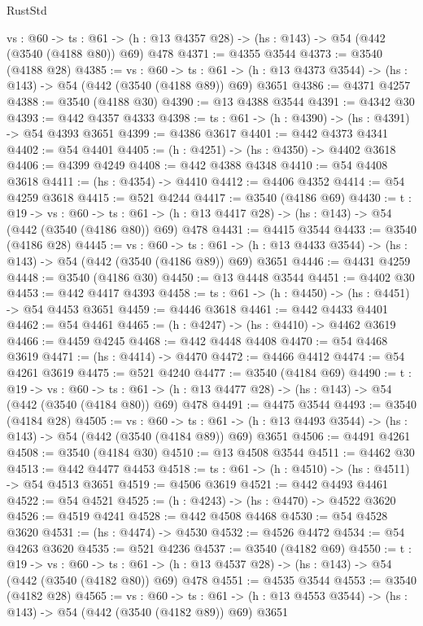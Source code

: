 \begin{lexlean}{RustStd}
\begin{coremodule}
  {vs : @60} ->
  {ts : @61} -> (h : @13 @4357 @28) -> (hs : @143) -> @54 (@442 (@3540 (@4188 @80)) @69) @478
@4371 := @4355 @3544
@4373 := @3540 (@4188 @28)
@4385 := {vs : @60} ->
  {ts : @61} -> (h : @13 @4373 @3544) -> (hs : @143) -> @54 (@442 (@3540 (@4188 @89)) @69) @3651
@4386 := @4371 @4257
@4388 := @3540 (@4188 @30)
@4390 := @13 @4388 @3544
@4391 := @4342 @30
@4393 := @442 @4357 @4333
@4398 := {ts : @61} -> (h : @4390) -> (hs : @4391) -> @54 @4393 @3651
@4399 := @4386 @3617
@4401 := @442 @4373 @4341
@4402 := @54 @4401
@4405 := (h : @4251) -> (hs : @4350) -> @4402 @3618
@4406 := @4399 @4249
@4408 := @442 @4388 @4348
@4410 := @54 @4408 @3618
@4411 := (hs : @4354) -> @4410
@4412 := @4406 @4352
@4414 := @54 @4259 @3618
@4415 := @521 @4244
@4417 := @3540 (@4186 @69)
@4430 := {t : @19} ->
  {vs : @60} ->
  {ts : @61} -> (h : @13 @4417 @28) -> (hs : @143) -> @54 (@442 (@3540 (@4186 @80)) @69) @478
@4431 := @4415 @3544
@4433 := @3540 (@4186 @28)
@4445 := {vs : @60} ->
  {ts : @61} -> (h : @13 @4433 @3544) -> (hs : @143) -> @54 (@442 (@3540 (@4186 @89)) @69) @3651
@4446 := @4431 @4259
@4448 := @3540 (@4186 @30)
@4450 := @13 @4448 @3544
@4451 := @4402 @30
@4453 := @442 @4417 @4393
@4458 := {ts : @61} -> (h : @4450) -> (hs : @4451) -> @54 @4453 @3651
@4459 := @4446 @3618
@4461 := @442 @4433 @4401
@4462 := @54 @4461
@4465 := (h : @4247) -> (hs : @4410) -> @4462 @3619
@4466 := @4459 @4245
@4468 := @442 @4448 @4408
@4470 := @54 @4468 @3619
@4471 := (hs : @4414) -> @4470
@4472 := @4466 @4412
@4474 := @54 @4261 @3619
@4475 := @521 @4240
@4477 := @3540 (@4184 @69)
@4490 := {t : @19} ->
  {vs : @60} ->
  {ts : @61} -> (h : @13 @4477 @28) -> (hs : @143) -> @54 (@442 (@3540 (@4184 @80)) @69) @478
@4491 := @4475 @3544
@4493 := @3540 (@4184 @28)
@4505 := {vs : @60} ->
  {ts : @61} -> (h : @13 @4493 @3544) -> (hs : @143) -> @54 (@442 (@3540 (@4184 @89)) @69) @3651
@4506 := @4491 @4261
@4508 := @3540 (@4184 @30)
@4510 := @13 @4508 @3544
@4511 := @4462 @30
@4513 := @442 @4477 @4453
@4518 := {ts : @61} -> (h : @4510) -> (hs : @4511) -> @54 @4513 @3651
@4519 := @4506 @3619
@4521 := @442 @4493 @4461
@4522 := @54 @4521
@4525 := (h : @4243) -> (hs : @4470) -> @4522 @3620
@4526 := @4519 @4241
@4528 := @442 @4508 @4468
@4530 := @54 @4528 @3620
@4531 := (hs : @4474) -> @4530
@4532 := @4526 @4472
@4534 := @54 @4263 @3620
@4535 := @521 @4236
@4537 := @3540 (@4182 @69)
@4550 := {t : @19} ->
  {vs : @60} ->
  {ts : @61} -> (h : @13 @4537 @28) -> (hs : @143) -> @54 (@442 (@3540 (@4182 @80)) @69) @478
@4551 := @4535 @3544
@4553 := @3540 (@4182 @28)
@4565 := {vs : @60} ->
  {ts : @61} -> (h : @13 @4553 @3544) -> (hs : @143) -> @54 (@442 (@3540 (@4182 @89)) @69) @3651

\end{coremodule}
\end{lexlean}

